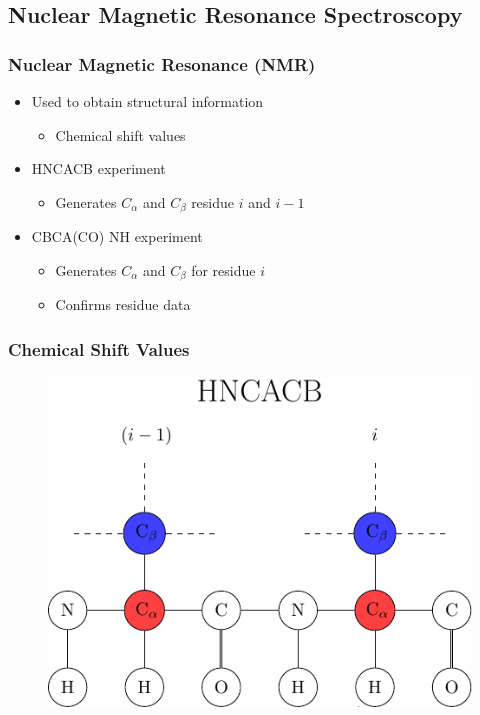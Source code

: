 \documentclass{beamer}
\begin{document}
\subsection{Nuclear Magnetic Resonance Spectroscopy} 
\begin{frame}
	\frametitle{Nuclear Magnetic Resonance (NMR)}
	\begin{itemize}
		\item Used to obtain structural information 
		\begin{itemize}
			\item Chemical shift values
		\end{itemize}
		\item HNCACB experiment
		\begin{itemize}
			\item Generates $C_\alpha$ and $C_{\beta}$ residue $i$ and $i-1$
		\end{itemize}
		\item CBCA(CO) NH experiment 
		\begin{itemize}
			\item Generates $C_\alpha$ and $C_{\beta}$ for residue $i$
			\item Confirms residue data
		\end{itemize}
	\end{itemize}
\end{frame}

\begin{frame}
	\frametitle{Chemical Shift Values}
	\begin{figure}[H]
	\begin{center}
	\includegraphics[width=.65\textwidth]{diagram}
	\end{center}
	\end{figure}
\end{frame}



\end{document}
